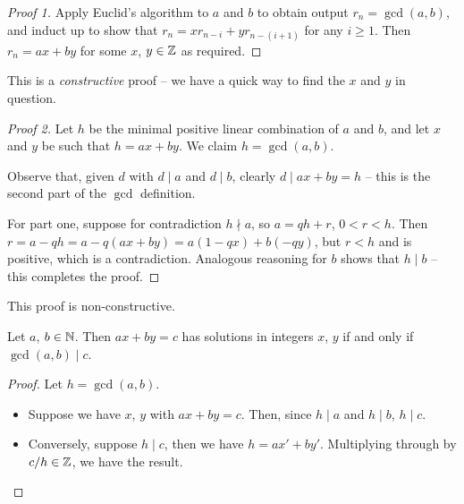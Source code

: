 \documentclass{../template/note}
\begin{document}
    \begin{proof}[Proof 1]
        Apply Euclid's algorithm to \(a\) and \(b\) to obtain output \(r_n = \gcd(a, b)\), and induct up to show that \(r_n = xr_{n-i} + yr_{n-(i+1)}\) for any \(i \geq 1\). Then \(r_n = ax + by\) for some \(x\), \(y \in \mathbb Z\) as required.
    \end{proof}
    
    \begin{remark*}
        This is a \emph{constructive} proof -- we have a quick way to find the \(x\) and \(y\) in question.
    \end{remark*}
    
    \begin{proof}[Proof 2]
        Let \(h\) be the minimal positive linear combination of \(a\) and \(b\), and let \(x\) and \(y\) be such that \(h=ax+by\). We claim \(h = \gcd(a, b)\).

        Observe that, given \(d\) with \(d \mid a\) and \(d \mid b\), clearly \(d \mid ax + by = h\) -- this is the second part of the \(\gcd\) definition.

        For part one, suppose for contradiction \(h \nmid a\), so \(a = qh + r\), \(0 < r < h\). Then \(r = a - qh = a - q(ax + by) = a(1-qx) +b(-qy)\), but \(r < h\) and is positive, which is a contradiction. Analogous reasoning for \(b\) shows that \(h \mid b\) -- this completes the proof.
    \end{proof}
    
    \begin{remark*}
        This proof is non-constructive.
    \end{remark*}
    
    \begin{corollary}
        Let \(a\), \(b \in \mathbb N\). Then \(ax + by = c\) has solutions in integers \(x\), \(y\) if and only if \(\gcd(a, b) \mid c\).
    \end{corollary}
    
    \begin{proof}
        Let \(h = \gcd(a, b)\).
        \begin{itemize}
            \item[\(\implies\)] Suppose we have \(x\), \(y\) with \(ax + by = c\). Then, since \(h \mid a\) and \(h \mid b\), \(h \mid c\).
            \item[\(\impliedby\)] Conversely, suppose \(h \mid c\), then we have \(h = ax' + by'\). Multiplying through by \(c/h \in \mathbb Z\), we have the result.
        \end{itemize}        
    \end{proof}
    
\end{document}
